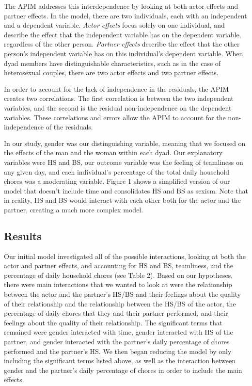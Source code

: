 \documentclass[
  man]{apa6}
\begin{document}
The APIM addresses this interdependence by looking at both actor effects and partner effects. In the model, there are two individuals, each with an independent and a dependent variable. \emph{Actor effects} focus solely on one individual, and describe the effect that the independent variable has on the dependent variable, regardless of the other person. \emph{Partner effects} describe the effect that the other person's independent variable has on this individual's dependent variable. When dyad members have distinguishable characteristics, such as in the case of heterosexual couples, there are two actor effects and two partner effects.

In order to account for the lack of independence in the residuals, the APIM creates two correlations. The first correlation is between the two independent variables, and the second is the residual non-independence on the dependent variables. These correlations and errors allow the APIM to account for the non-independence of the residuals.

In our study, gender was our distinguishing variable, meaning that we focused on the effects of the man and the woman within each dyad. Our explanatory variables were HS and BS, our outcome variable was the feeling of teamliness on any given day, and each individual's percentage of the total daily household chores was a moderating variable. Figure 1 shows a simplified version of our model that doesn't include time and consolidates HS and BS as sexism. Note that in reality, HS and BS would interact with each other both for the actor and the partner, creating a much more complex model.

\hypertarget{results-1}{%
\subsection{Results}\label{results-1}}

Our initial model investigated all of the possible interactions, looking at both the actor and partner effects, and accounting for HS and BS, teamliness, and the percentage of daily household chores (see Table 2). Based on our hypotheses, there were main interactions that we wanted to look at were the relationship between the actor and the partner's HS/BS and their feelings about the quality of their relationship and the relationship between the HS/BS of the actor, the percentage of daily chores that they and their partner performed, and their feelings about the quality of their relationship. The significant terms that remained were gender interacted with time, gender interacted with HS of the partner, and gender interacted with the partner's daily percentage of chores performed and the partner's HS. We then began reducing the model by only including the significant terms listed above, as well as the interaction between gender and the partner's daily percentage of chores in order to include the main effects.
\end{document}
